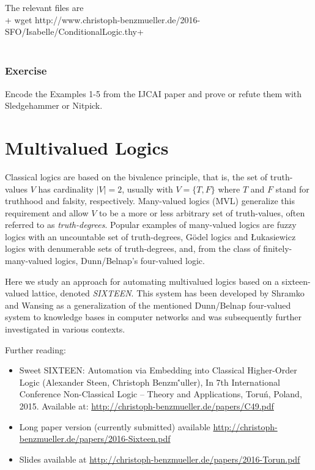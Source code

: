\documentclass{article}
\begin{document}
The relevant files are \\[1em]
+ wget http://www.christoph-benzmueller.de/2016-SFO/Isabelle/ConditionalLogic.thy+ \\
\\[1em]

\subsubsection{Exercise}
Encode the Examples 1-5 from the IJCAI paper and prove or refute  them
with Sledgehammer or Nitpick.





\section{Multivalued Logics}
Classical logics are based on the bivalence principle, that is, the
set of truth-values $V$ has cardinality $|V| = 2$, usually with
$V = \{T, F\}$ where $T$ and $F$ stand for truthhood and falsity,
respectively.  Many-valued logics (MVL) generalize this requirement
and allow $V$ to be a more or less arbitrary set of truth-values,
often referred to as \textit{truth-degrees}.  Popular examples of
many-valued logics are fuzzy logics with an uncountable set of
truth-degrees, G\"odel logics and \L ukasiewicz logics with
denumerable sets of truth-degrees, and, from the class of
finitely-many-valued logics, Dunn/Belnap's four-valued logic.
 
Here we study an approach for automating multivalued logics based on a
sixteen-valued lattice, denoted \textit{SIXTEEN}. This system has been
developed by Shramko and Wansing as a generalization of the mentioned
Dunn/Belnap four-valued system to knowledge bases in computer networks
and was subsequently further investigated in various contexts.
 

Further reading:
\begin{itemize}
\item Sweet SIXTEEN: Automation via Embedding into Classical
  Higher-Order Logic (Alexander Steen, Christoph Benzm\''uller), In 7th
  International Conference Non-Classical Logic -- Theory and
  Applications, Toruń, Poland, 2015.  Available at:   \href{http://christoph-benzmueller.de/papers/C49.pdf}{http://christoph-benzmueller.de/papers/C49.pdf}
\item Long paper version (currently submitted) available
  \href{http://christoph-benzmueller.de/papers/2016-Sixteen.pdf}{http://christoph-benzmueller.de/papers/2016-Sixteen.pdf}
\item Slides available at  \href{http://christoph-benzmueller.de/papers/2016-Torun.pdf}{http://christoph-benzmueller.de/papers/2016-Torun.pdf}
\end{itemize}
 
\end{document}
